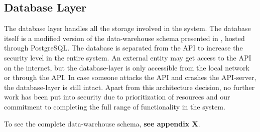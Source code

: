\subsection{Database Layer}\label{subsec:dblayer}
The database layer handles all the storage involved in the system. The database itself is a modified version of the data-warehouse schema presented in \cite{sw9_report}, hosted through PostgreSQL\cite{postgresql}. The database is separated from the API to increase the security level in the entire system. An external entity may get access to the API on the internet, but the database-layer is only accessible from the local network or through the API. In case someone attacks the API and crashes the API-server, the database-layer is still intact. Apart from this architecture decision, no further work has been put into security due to prioritization of resources and our commitment to completing the full range of functionality in the system. 

To see the complete data-warehouse schema, \textbf{see appendix X}.